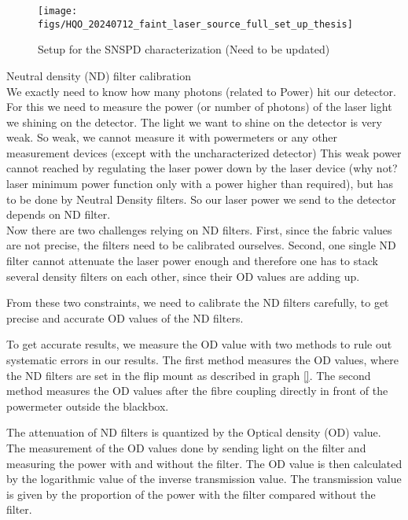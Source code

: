 \begin{figure}
    \centering
    \texttt{[image: figs/HQO\_20240712\_faint\_laser\_source\_full\_set\_up\_thesis]}
    \caption{Setup for the SNSPD characterization (Need to be updated)}
    \label{fig: faint_laser_source_full_set_up}
\end{figure}

Neutral density (ND) filter calibration \\

We exactly need to know how many photons (related to Power) hit our detector.
For this we need to measure the power (or number of photons) of the laser light we shining on the detector.
The light we want to shine on the detector is very weak.
So weak, we cannot measure it with powermeters or any other measurement devices (except with the uncharacterized detector)
This weak power cannot reached by regulating the laser power down by the laser device (why not? laser minimum power function
only with a power higher than required), but has to be done by Neutral Density filters.
So our laser power we send to the detector depends on ND filter.\\

Now there are two challenges relying on ND filters.
First, since the fabric values are not precise, the filters need to be calibrated ourselves.
Second, one single ND filter cannot attenuate the laser power enough and therefore one has to stack several density
filters on each other, since their OD values are adding up.

From these two constraints, we need to calibrate the ND filters carefully, to get precise and accurate OD values of the
ND filters.

To get accurate results, we measure the OD value with two methods to rule out systematic errors in our results.
The first method measures the OD values, where the ND filters are set in the flip mount as described in graph \ref{}.
The second method measures the OD values after the fibre coupling directly in front of the powermeter
outside the blackbox.

The attenuation of ND filters is quantized by the Optical density (OD) value.
The measurement of the OD values done by sending light on the filter and measuring the power with and
without the filter.
The OD value is then calculated by the logarithmic value of the inverse transmission value.
The transmission value is given by the proportion of the power with the filter compared without the filter.

